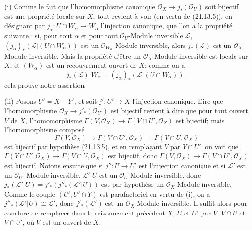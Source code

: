 (i) Comme le fait que l'homomorphisme canonique
$\mathcal O_X\to j_*(\mathcal O_U)$ soit bijectif est une propriété locale sur $X$,
tout revient à voir (en vertu de (21.13.5)), en désignant par
$j_\alpha:U\cap W_\alpha\to W_\alpha$ l'injection canonique, que l'on a la propriété
suivante : si, pour tout $\alpha$ et pour tout $\mathcal O_U$-Module inversible
$\mathscr L$, $(j_\alpha)_*(\mathscr L|(U\cap W_\alpha))$ est un
$\mathcal O_{W_\alpha}$-Module inversible, alors $j_*(\mathscr L)$ est un
$\mathcal O_X$-Module inversible. Mais la propriété d'être un $\mathcal O_X$-Module
inversible est locale sur $X$, et $(W_\alpha)$ est un recouvrement ouvert de $X$;
comme on a
\[
  j_*(\mathscr L)|W_\alpha
  =(j_\alpha)_*(\mathscr L|(U\cap W_\alpha)),
\]
cela prouve notre assertion.

(ii) Posons $U'=X-Y'$, et soit $j':U'\to X$ l'injection canonique. Dire que
l'homomorphisme $\mathcal O_X\to j'_*(\mathcal O_{U'})$ est bijectif revient à dire
que pour tout ouvert $V$ de $X$, l'homomorphisme
$\Gamma(V,\mathcal O_X)\to\Gamma(V\cap U',\mathcal O_X)$ est bijectif; mais
l'homomorphisme composé
\[
  \Gamma(V,\mathcal O_X)\longrightarrow\Gamma(V\cap U',\mathcal O_X)
  \longrightarrow\Gamma(V\cap U,\mathcal O_X)
\]
est bijectif par hypothèse (21.13.5), et en remplaçant $V$ par $V\cap U'$, on voit que
$\Gamma(V\cap U',\mathcal O_X)\to\Gamma(V\cap U,\mathcal O_X)$ est bijectif, donc
$\Gamma(V,\mathcal O_X)\to\Gamma(V\cap U',\mathcal O_X)$ est bijectif. Notons ensuite
que si $j'':U\to U'$ est l'injection canonique et si $\mathscr L'$ est un
$\mathcal O_{U'}$-Module inversible, $\mathscr L'|U$ est un $\mathcal O_U$-Module
inversible, donc
$j_*(\mathscr L'|U)=j'_*(j''_*(\mathscr L'|U))$ est par hypothèse un
$\mathcal O_X$-Module inversible. Comme le couple $(U',U'\cap Y)$ est parafactoriel
en vertu de (i), on a $j''_*(\mathscr L'|U)\cong\mathscr L'$, donc
$j'_*(\mathscr L')$ est un $\mathcal O_X$-Module inversible. Il suffit alors pour
conclure de remplacer dans le raisonnement précédent $X$, $U$ et $U'$ par $V$,
$V\cap U$ et $V\cap U'$, où $V$ est un ouvert de $X$.

